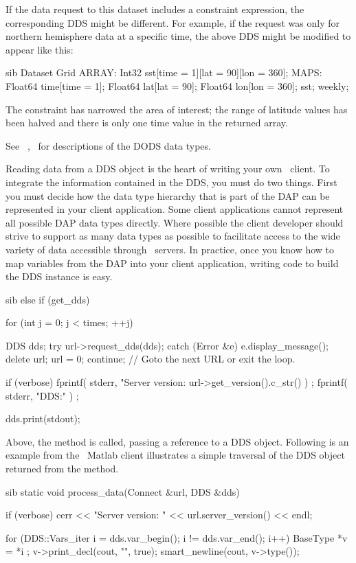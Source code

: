 \documentclass{dods-paper}
\begin{document}
If the data request to this dataset includes a constraint expression,
the corresponding DDS might be different. For example, if the request
was only for northern hemisphere data at a specific time, the above
DDS might be modified to appear like this:

\begin{vcode}{sib}
Dataset {
    Grid {
      ARRAY:
	 Int32 sst[time = 1][lat = 90][lon = 360];
      MAPS:
	 Float64 time[time = 1];
	 Float64 lat[lat = 90];
	 Float64 lon[lon = 360];
    } sst;
} weekly;
\end{vcode}
       
The constraint has narrowed the area of interest; the range of latitude
values has been halved and there is only one time value in the returned
array. 

See \OPDuser\ , \OPDapiref\ for descriptions of the DODS data types.

Reading data from a DDS object is the heart of writing your own \opendap\
client. To integrate the information contained in the DDS, you must do two
things. First you must decide how the data type hierarchy that is part of the
DAP can be represented in your client application. Some client applications
cannot represent all possible DAP data types directly. Where possible the
client developer should strive to support as many data types as possible to
facilitate access to the wide variety of data accessible through \opendap\
servers. In practice, once you know how to map variables from the DAP into
your client application, writing code to build the DDS instance is easy.

\begin{vcode}{sib}
else if (get_dds) {
    for (int j = 0; j < times; ++j) {
	DDS dds;
	try {
	    url->request_dds(dds);
	}
	catch (Error &e) {
	    e.display_message();
	    delete url; url = 0;
	    continue;	// Goto the next URL or exit the loop.
	}

	if (verbose) {
	    fprintf( stderr, "Server version: %
			     url->get_version().c_str() ) ; 
	    fprintf( stderr, "DDS:\n" ) ;
	}

	dds.print(stdout);
    }
}
\end{vcode}

Above, the  method  is called, passing a
reference to a DDS object. Following is an example from the \Cpp\ Matlab client
illustrates a simple traversal of the DDS object returned from the
\lit{connect::request\_data} method.
  
\begin{vcode}{sib}
static void
process_data(Connect &url, DDS &dds)
{
   if (verbose)
       cerr << "Server version: " << url.server_version() << endl;

   for (DDS::Vars_iter i = dds.var_begin(); i != dds.var_end(); i++) {
       BaseType *v = *i ;
       v->print_decl(cout, "", true);
       smart_newline(cout, v->type());
   }
}
\end{vcode}
\end{document}
